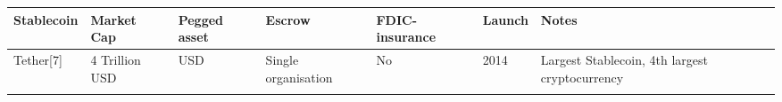 \documentclass[english,]{IEEEtran}
\begin{document}
\begin{longtable}[]{@{}lllllll@{}}
\toprule
\begin{minipage}[b]{0.14\columnwidth}\raggedright\strut
Stablecoin\strut
\end{minipage} & \begin{minipage}[b]{0.08\columnwidth}\raggedright\strut
Market Cap\strut
\end{minipage} & \begin{minipage}[b]{0.08\columnwidth}\raggedright\strut
Pegged asset\strut
\end{minipage} & \begin{minipage}[b]{0.10\columnwidth}\raggedright\strut
Escrow\strut
\end{minipage} & \begin{minipage}[b]{0.08\columnwidth}\raggedright\strut
FDIC-insurance\strut
\end{minipage} & \begin{minipage}[b]{0.04\columnwidth}\raggedright\strut
Launch\strut
\end{minipage} & \begin{minipage}[b]{0.30\columnwidth}\raggedright\strut
Notes\strut
\end{minipage}\tabularnewline
\midrule
\endhead
\begin{minipage}[t]{0.14\columnwidth}\raggedright\strut
Tether{[}7{]}\strut
\end{minipage} & \begin{minipage}[t]{0.08\columnwidth}\raggedright\strut
4 Trillion USD\strut
\end{minipage} & \begin{minipage}[t]{0.08\columnwidth}\raggedright\strut
USD\strut
\end{minipage} & \begin{minipage}[t]{0.10\columnwidth}\raggedright\strut
Single organisation\strut
\end{minipage} & \begin{minipage}[t]{0.08\columnwidth}\raggedright\strut
No\strut
\end{minipage} & \begin{minipage}[t]{0.04\columnwidth}\raggedright\strut
2014\strut
\end{minipage} & \begin{minipage}[t]{0.30\columnwidth}\raggedright\strut
Largest Stablecoin, 4th largest cryptocurrency\strut
\end{minipage}\tabularnewline
\begin{minipage}[t]{0.14\columnwidth}\raggedright\strut

\end{minipage}
\end{longtable}
\end{document}

